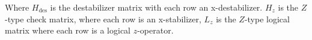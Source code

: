 Where $H_{\text{des}}$ is the destabilizer matrix with each row an x-destabilizer. \( H_z\) is the $Z$-type check matrix, where each row is an x-stabilizer, \( L_z \) is the $Z$-type logical matrix where each row is a logical $z$-operator.





